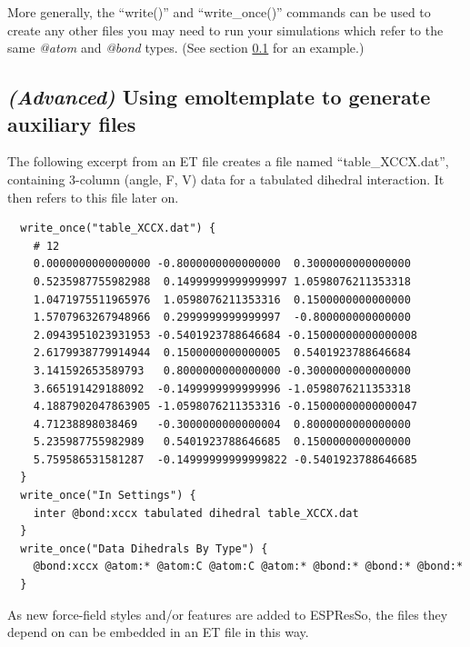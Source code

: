 \documentclass[11pt]{article}
\begin{document}
More generally, the ``write()'' and ``write\_once()'' commands can be used to
create any other files you may need to run your simulations
which refer to the same \textit{@atom} and \textit{@bond} types.
(See section \ref{sec:aux_files} 
for an example.)



\subsection{\textit{(Advanced)} 
             Using emoltemplate to generate auxiliary files}
\label{sec:aux_files}
The following excerpt from an ET file 
creates a file named ``table\_XCCX.dat'', containing 
3-column (angle, F, V) data for a tabulated dihedral interaction.
It then refers to this file later on.
\begin{verbatim}
  write_once("table_XCCX.dat") {
    # 12
    0.0000000000000000 -0.8000000000000000  0.3000000000000000
    0.5235987755982988  0.14999999999999997 1.0598076211353318
    1.0471975511965976  1.0598076211353316  0.1500000000000000
    1.5707963267948966  0.2999999999999997  -0.800000000000000
    2.0943951023931953 -0.5401923788646684 -0.15000000000000008
    2.6179938779914944  0.1500000000000005  0.5401923788646684
    3.141592653589793   0.8000000000000000 -0.3000000000000000
    3.665191429188092  -0.1499999999999996 -1.0598076211353318
    4.1887902047863905 -1.0598076211353316 -0.15000000000000047
    4.71238898038469   -0.3000000000000004  0.8000000000000000
    5.235987755982989   0.5401923788646685  0.1500000000000000
    5.759586531581287  -0.14999999999999822 -0.5401923788646685
  }
  write_once("In Settings") {
    inter @bond:xccx tabulated dihedral table_XCCX.dat
  }
  write_once("Data Dihedrals By Type") {
    @bond:xccx @atom:* @atom:C @atom:C @atom:* @bond:* @bond:* @bond:*
  }
\end{verbatim}
As new force-field styles and/or features are added to ESPResSo, 
the files they depend on can be embedded in an ET file in this way. 
\end{document}

